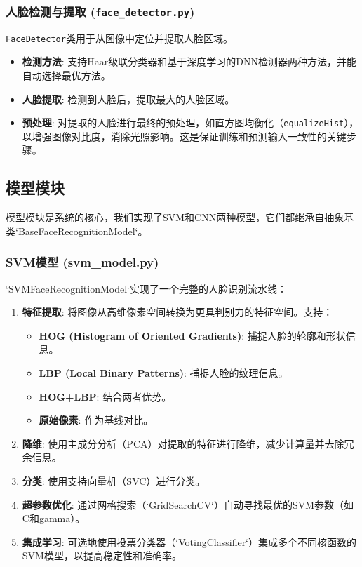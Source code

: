 \documentclass[a4paper]{article}
\begin{document}
\subsubsection{人脸检测与提取 (\texttt{face\_detector.py})}
\texttt{FaceDetector}类用于从图像中定位并提取人脸区域。
\begin{itemize}
    \item \textbf{检测方法}: 支持Haar级联分类器和基于深度学习的DNN检测器两种方法，并能自动选择最优方法。
    \item \textbf{人脸提取}: 检测到人脸后，提取最大的人脸区域。
    \item \textbf{预处理}: 对提取的人脸进行最终的预处理，如直方图均衡化（\texttt{equalizeHist}），以增强图像对比度，消除光照影响。这是保证训练和预测输入一致性的关键步骤。
\end{itemize}

\subsection{模型模块}
模型模块是系统的核心，我们实现了SVM和CNN两种模型，它们都继承自抽象基类`BaseFaceRecognitionModel`。

\subsubsection{SVM模型 (svm\_model.py)}
`SVMFaceRecognitionModel`实现了一个完整的人脸识别流水线：
\begin{enumerate}
    \item \textbf{特征提取}: 将图像从高维像素空间转换为更具判别力的特征空间。支持：
    \begin{itemize}
        \item \textbf{HOG (Histogram of Oriented Gradients)}: 捕捉人脸的轮廓和形状信息。
        \item \textbf{LBP (Local Binary Patterns)}: 捕捉人脸的纹理信息。
        \item \textbf{HOG+LBP}: 结合两者优势。
        \item \textbf{原始像素}: 作为基线对比。
    \end{itemize}
    \item \textbf{降维}: 使用主成分分析（PCA）对提取的特征进行降维，减少计算量并去除冗余信息。
    \item \textbf{分类}: 使用支持向量机（SVC）进行分类。
    \item \textbf{超参数优化}: 通过网格搜索（`GridSearchCV`）自动寻找最优的SVM参数（如C和gamma）。
    \item \textbf{集成学习}: 可选地使用投票分类器（`VotingClassifier`）集成多个不同核函数的SVM模型，以提高稳定性和准确率。
\end{enumerate}
\end{document}
